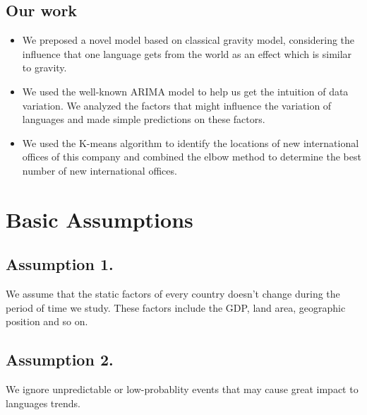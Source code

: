 \documentclass{mcmthesis}
\begin{document}
\subsection{Our work}
  \indent \indent 
  \begin{itemize}
    \item We preposed a novel model based on classical gravity model, considering the influence that one language gets from the world as an effect which is similar to gravity.
    \item We used the well-known ARIMA model to help us get the intuition of data variation. We analyzed the factors that might influence the variation of languages and made simple predictions on these factors.
    \item We used the K-means algorithm to identify the locations of new international offices of this company and combined the elbow method to determine the best number of new international offices.
  \end{itemize}



\section{Basic Assumptions}
\subsection{Assumption 1.}

  \indent \indent We assume that the static factors of every country doesn't change during the period of time we study. These factors include the GDP, land area, geographic position and so on.

\subsection{Assumption 2.}

  \indent \indent We ignore unpredictable or low-probablity events that may cause great impact to languages trends.
 
\end{document}
